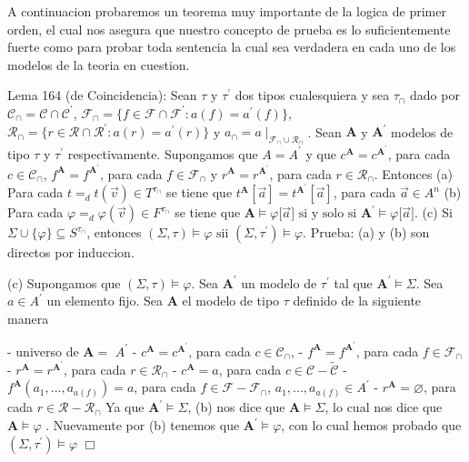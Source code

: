 A continuacion probaremos un teorema muy importante de la logica de primer orden, el cual nos asegura que nuestro concepto de prueba es lo suficientemente fuerte como para probar toda sentencia la cual sea verdadera en cada uno de los modelos de la teoria en cuestion.

Lema 164 (de Coincidencia): Sean \(\tau \) y \(\tau ^{\prime }\) dos tipos cualesquiera y sea \(\tau _{\cap }\) dado por \(\mathcal{C}_{\cap }=\mathcal{C}\cap \mathcal{C} ^{\prime }\), \(\mathcal{F}_{\cap }=\{f\in \mathcal{F}\cap \mathcal{F}^{\prime }:a(f)=a^{\prime }(f)\}\), \(\mathcal{R}_{\cap }=\{r\in \mathcal{R}\cap \mathcal{R}^{\prime }:a(r)=a^{\prime }(r)\}\) y \(a_{\cap }=a\mid _{\mathcal{F} _{\cap }\cup \mathcal{R}_{\cap }}\). Sean \(\mathbf{A}\) y \(\mathbf{A}^{\prime } \) modelos de tipo \(\tau \) y \(\tau ^{\prime }\) respectivamente. Supongamos que \(A=A^{\prime }\) y que \(c^{\mathbf{A}}=c^{\mathbf{A}^{\prime }}\), para cada \(c\in \mathcal{C}_{\cap }\), \(f^{\mathbf{A}}=f^{\mathbf{A}^{\prime }}\), para cada \(f\in \mathcal{F}_{\cap }\) y \(r^{\mathbf{A}}=r^{\mathbf{A}^{\prime }}\), para cada \(r\in \mathcal{R}_{\cap }\). Entonces
(a) Para cada \(t=_{d}t(\vec{v})\in T^{\tau _{\cap }}\) se tiene que \( t^{\mathbf{A}}[\vec{a}]=t^{\mathbf{A}^{\prime }}[\vec{a}]\), para cada \(\vec{a }\in A^{n}\)
(b) Para cada \(\varphi =_{d}\varphi (\vec{v})\in F^{\tau _{\cap }}\) se tiene que
\(\displaystyle \mathbf{A}\models \varphi \lbrack \vec{a}]\text{ si y solo si }\mathbf{A} ^{\prime }\models \varphi \lbrack \vec{a}]\text{.} \)
(c) Si \(\Sigma \cup \{\varphi \}\subseteq S^{\tau _{\cap }}\), entonces
\(\displaystyle (\Sigma ,\tau )\models \varphi \text{ sii }(\Sigma ,\tau ^{\prime })\models \varphi \text{.} \)
Prueba: (a) y (b) son directos por induccion.

(c) Supongamos que \((\Sigma ,\tau )\models \varphi \). Sea \(\mathbf{A} ^{\prime }\) un modelo de \(\tau ^{\prime }\) tal que \(\mathbf{A}^{\prime }\models \Sigma \). Sea \(a\in A^{\prime }\) un elemento fijo. Sea \(\mathbf{A}\) el modelo de tipo \(\tau \) definido de la siguiente manera

- universo de \(\mathbf{A}=\) \(A^{\prime }\)
- \(c^{\mathbf{A}}=c^{\mathbf{A}^{\prime }}\), para cada \(c\in \mathcal{ C}_{\cap }\),
- \(f^{\mathbf{A}}=f^{\mathbf{A}^{\prime }}\), para cada \(f\in \mathcal{ F}_{\cap }\)
- \(r^{\mathbf{A}}=r^{\mathbf{A}^{\prime }}\), para cada \(r\in \mathcal{ R}_{\cap }\)
- \(c^{\mathbf{A}}=a\), para cada \(c\in \mathcal{C}-\widetilde{\mathcal{ C}}\)
- \(f^{\mathbf{A}}(a_{1},...,a_{a(f)})=a\), para cada \(f\in \mathcal{F}- \mathcal{F}_{\cap }\), \(a_{1},...,a_{a(f)}\in A^{\prime }\)
- \(r^{\mathbf{A}}=\varnothing \), para cada \(r\in \mathcal{R-R}_{\cap }\)
Ya que \(\mathbf{A}^{\prime }\models \Sigma \), (b) nos dice que \( \mathbf{A}\models \Sigma \), lo cual nos dice que \(\mathbf{A}\models \varphi \) . Nuevamente por (b) tenemos que \(\mathbf{A}^{\prime }\models \varphi \), con lo cual hemos probado que \((\Sigma ,\tau ^{\prime })\models \varphi \) \(\Box\)

